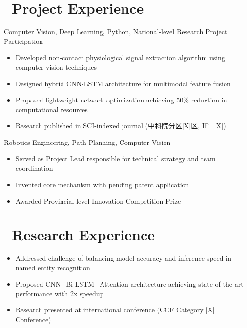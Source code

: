 \documentclass{resume}
\begin{document}
\section{\faUsers\ Project Experience}
Computer Vision, Deep Learning, Python, National-level Research Project Participation
\begin{itemize}
  \item Developed non-contact physiological signal extraction algorithm using computer vision techniques
  \item Designed hybrid CNN-LSTM architecture for multimodal feature fusion
  \item Proposed lightweight network optimization achieving 50\% reduction in computational resources
  \item Research published in SCI-indexed journal (中科院分区[X]区, IF=[X])
\end{itemize}

Robotics Engineering, Path Planning, Computer Vision
\begin{itemize}
  \item Served as Project Lead responsible for technical strategy and team coordination
  \item Invented core mechanism with pending patent application
  \item Awarded Provincial-level Innovation Competition Prize
\end{itemize}

\section{\faHeartO\ Research Experience}
\begin{itemize}
  \item Addressed challenge of balancing model accuracy and inference speed in named entity recognition
  \item Proposed CNN+Bi-LSTM+Attention architecture achieving state-of-the-art performance with 2x speedup
  \item Research presented at international conference (CCF Category [X] Conference)
\end{itemize}
\end{document}
